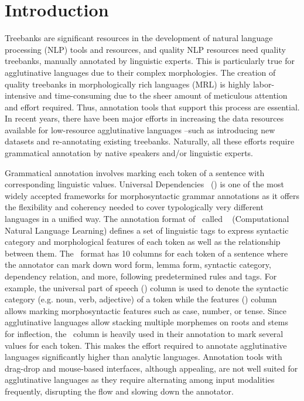 \section{Introduction}
\label{sec:introduction}

Treebanks are significant resources in the development of natural language processing (NLP) tools and resources, and quality NLP resources need quality treebanks, manually annotated by linguistic experts.
This is particularly true for agglutinative languages due to their complex morphologies.
The creation of quality treebanks in morphologically rich languages (MRL) is highly labor-intensive and time-consuming due to the sheer amount of meticulous attention and effort required.
Thus, annotation tools that support this process are essential.
In recent years, there have been major efforts in increasing the data resources available for low-resource agglutinative languages --such as introducing new datasets and re-annotating existing treebanks.
Naturally, all these efforts require grammatical annotation by native speakers and/or linguistic experts.

Grammatical annotation involves marking each token of a sentence with corresponding linguistic values.
Universal Dependencies~\cite{ud} (\ud) is one of the most widely accepted frameworks for morphosyntactic grammar annotations as it offers the flexibility and coherency needed to cover typologically very different languages in a unified way.
The annotation format of \ud\ called \conllu~\cite{conll} (Computational Natural Language Learning) defines a set of linguistic tags to express syntactic category and morphological features of each token as well as the relationship between them.
The \conllu\ format has 10 columns for each token of a sentence where the annotator can mark down word form, lemma form, syntactic category, dependency relation, and more, following predetermined rules and tags.
For example, the universal part of speech (\upos) column is used to denote the syntactic category (e.g. noun, verb, adjective) of a token while the features (\feats) column allows marking morphosyntactic features such as case, number, or tense.
Since agglutinative languages allow stacking multiple morphemes on roots and stems for inflection, the \feats\ column is heavily used in their annotation to mark several values for each token.
This makes the effort required to annotate agglutinative languages significantly higher than analytic languages.
Annotation tools with drag-drop and mouse-based interfaces, although appealing, are not well suited for agglutinative languages as they require alternating among input modalities frequently, disrupting the flow and slowing down the annotator.


